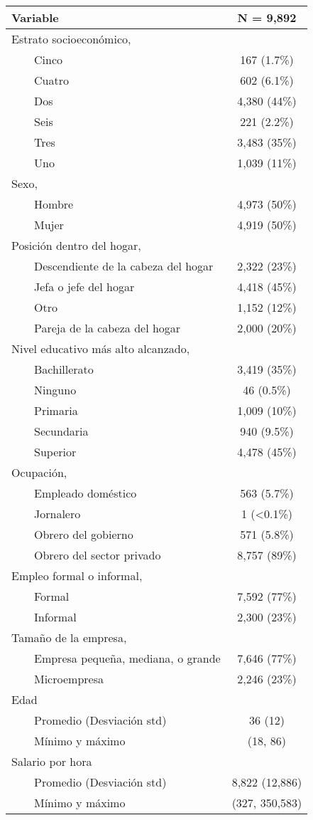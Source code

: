 \begin{longtable}{lc}
\toprule
\textbf{Variable} & \textbf{N = 9,892} \\ 
\midrule
Estrato socioeconómico,  &  \\ 
    Cinco & 167  (1.7\%) \\ 
    Cuatro & 602  (6.1\%) \\ 
    Dos & 4,380  (44\%) \\ 
    Seis & 221  (2.2\%) \\ 
    Tres & 3,483  (35\%) \\ 
    Uno & 1,039  (11\%) \\ 
Sexo,  &  \\ 
    Hombre & 4,973  (50\%) \\ 
    Mujer & 4,919  (50\%) \\ 
Posición dentro del hogar,  &  \\ 
    Descendiente de la cabeza del hogar & 2,322  (23\%) \\ 
    Jefa o jefe del hogar & 4,418  (45\%) \\ 
    Otro & 1,152  (12\%) \\ 
    Pareja de la cabeza del hogar & 2,000  (20\%) \\ 
Nivel educativo más alto alcanzado,  &  \\ 
    Bachillerato & 3,419  (35\%) \\ 
    Ninguno & 46  (0.5\%) \\ 
    Primaria & 1,009  (10\%) \\ 
    Secundaria & 940  (9.5\%) \\ 
    Superior & 4,478  (45\%) \\ 
Ocupación,  &  \\ 
    Empleado doméstico & 563  (5.7\%) \\ 
    Jornalero & 1  (<0.1\%) \\ 
    Obrero del gobierno & 571  (5.8\%) \\ 
    Obrero del sector privado & 8,757  (89\%) \\ 
Empleo formal o informal,  &  \\ 
    Formal & 7,592  (77\%) \\ 
    Informal & 2,300  (23\%) \\ 
Tamaño de la empresa,  &  \\ 
    Empresa pequeña, mediana, o grande & 7,646  (77\%) \\ 
    Microempresa & 2,246  (23\%) \\ 
Edad &  \\ 
    Promedio (Desviación std) & 36 (12) \\ 
    Mínimo y máximo & (18, 86) \\ 
Salario por hora &  \\ 
    Promedio (Desviación std) & 8,822 (12,886) \\ 
    Mínimo y máximo & (327, 350,583) \\ 
\bottomrule
\end{longtable}

